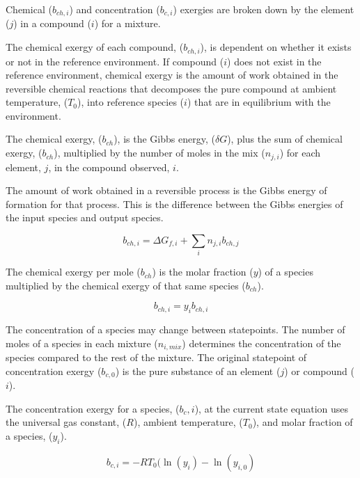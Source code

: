 \documentclass[energies,article,submit,pdftex,moreauthors]{Definitions/mdpi}
\begin{document}

Chemical ($b_{ch,i}$) and concentration ($b_{c,i}$) exergies are broken down
by the element ($j$) in a compound ($i$)
for a mixture.

The chemical exergy of each compound, ($b_{ch,i}$), is dependent
on whether it exists or not
in the reference environment.
If compound ($i$) does not exist
in the reference environment,
chemical exergy is the amount of work obtained
in the reversible chemical reactions
that decomposes the pure compound at ambient temperature, ($T_{0}$),
into reference species ($i$) that are in equilibrium
with the environment.

The chemical exergy, ($b_{ch}$), is the Gibbs energy, ($\delta{G}$),
plus the sum of chemical exergy, ($b_{ch}$),
multiplied by the number of moles
in the mix ($n_{j,i}$) for each element, $j$,
in the compound observed, $i$.

The amount of work obtained
in a reversible process is the Gibbs energy
of formation for that process.
This is the difference between the Gibbs energies
of the input species and output species.

\begin{equation}\label{eq:specific_chemical_exergy_definition}
  b_{ch,i} = \Delta{G_{f,i}} + \sum_{i}{n_{j,i}b_{ch,j}}
\end{equation}

The chemical exergy per mole ($b_{ch}$) is the molar fraction ($y$)
of a species multiplied by the chemical exergy of that same species ($b_{ch}$).

\begin{equation}\label{eq:chemical_exergy_state_point1}
  b_{ch,i} = y_{i}b_{ch,i}
\end{equation}

The concentration of a species
may change between statepoints.
The number of moles of a species in each mixture ($n_{i,mix}$)
determines the concentration of the species
compared to the rest of the mixture.
The original statepoint of concentration exergy ($b_{c,0}$) is the pure substance
of an element ($j$) or compound ($i$).

The concentration exergy for a species, ($b_c,i$),
at the current state
equation uses the universal gas constant, ($R$),
ambient temperature, ($T_0$),
and molar fraction of a species, ($y_i$).

\begin{equation}\label{eq:specific_concentration_exergy_of_current_statepoint_definition}
  b_{c,i} = -RT_{0}(\ln(y_{i}) - \ln(y_{i,0})
\end{equation}
\end{document}
